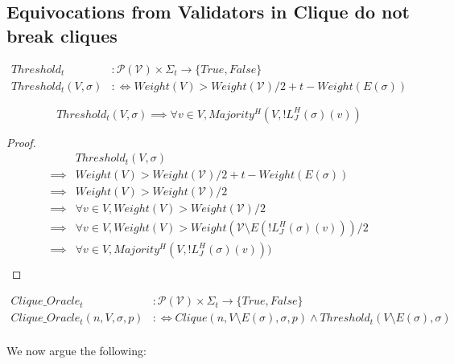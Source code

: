 \subsection{Equivocations from Validators in Clique do not break cliques}

\begin{defn}
\begin{align}
Threshold_t&: \mathcal{P}(\mathcal{V}) \times \Sigma_t \to \{True, False\} \\
Threshold_t(V, \sigma) &:\Leftrightarrow Weight(V) > Weight(\mathcal{V})/2 + t - Weight(E(\sigma))
\end{align}
\end{defn}

\begin{lemma}
  $$
    Threshold_t(V, \sigma) \implies \forall v \in V, Majority^H(V, !L^H_J(\sigma)(v))
  $$
\end{lemma}

\begin{proof}
  \begin{align}
            & Threshold_t(V, \sigma) \\
    \implies& Weight(V) > Weight(\mathcal{V})/2 + t - Weight(E(\sigma)) \\
    \implies& Weight(V) > Weight(\mathcal{V})/2 \\
    \implies& \forall v \in V, Weight(V) > Weight(\mathcal{V})/2 \\
    \implies& \forall v \in V, Weight(V) > Weight(\mathcal{V} \setminus E(!L^H_J(\sigma)(v)))/2 \\
    \implies& \forall v \in V, Majority^H(V, !L^H_J(\sigma)(v))) \\
  \end{align}
\end{proof}



\begin{defn}
\begin{align}
Clique\_Oracle_t&: \mathcal{P}(\mathcal{V}) \times \Sigma_t \to \{True, False\} \\
Clique\_Oracle_t(n, V, \sigma, p) &:\Leftrightarrow Clique(n, V \setminus E(\sigma), \sigma, p) \land Threshold_t(V \setminus E(\sigma), \sigma) \\
\end{align}
\end{defn}

We now argue the following:

